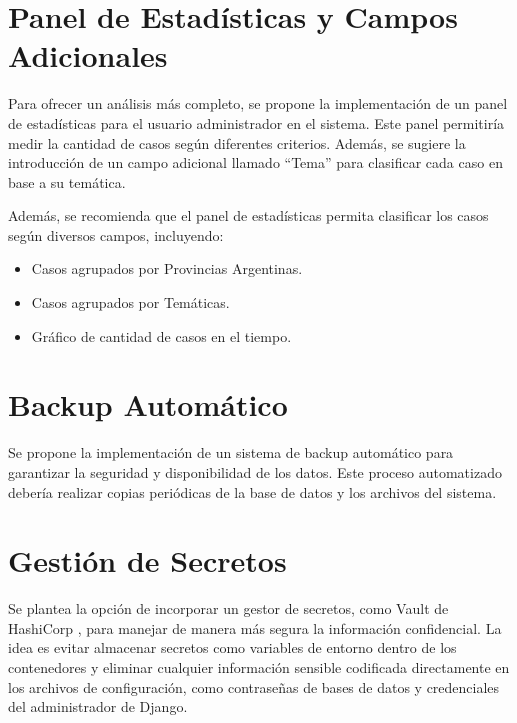 \section{Panel de Estadísticas y Campos Adicionales}

Para ofrecer un análisis más completo, se propone la implementación de un panel de estadísticas para el usuario administrador en el sistema. Este panel permitiría medir la cantidad de casos según diferentes criterios. Además, se sugiere la introducción de un campo adicional llamado ``Tema'' para clasificar cada caso en base a su temática.

Además, se recomienda que el panel de estadísticas permita clasificar los casos según diversos campos, incluyendo:
\begin{itemize}
\item Casos agrupados por Provincias Argentinas.
\item Casos agrupados por Temáticas.
\item Gráfico de cantidad de casos en el tiempo.
\end{itemize}

\section{Backup Automático}
Se propone la implementación de un sistema de backup automático para garantizar la seguridad y disponibilidad de los datos. Este proceso automatizado debería realizar copias periódicas de la base de datos y los archivos del sistema.

\section{Gestión de Secretos}
Se plantea la opción de incorporar un gestor de secretos, como Vault de HashiCorp \cite{voult}, para manejar de manera más segura la información confidencial. La idea es evitar almacenar secretos como variables de entorno dentro de los contenedores y eliminar cualquier información sensible codificada directamente en los archivos de configuración, como contraseñas de bases de datos y credenciales del administrador de Django.
